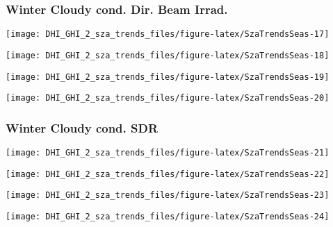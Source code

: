 \documentclass[
  10pt,
  a4paper,oneside]{article}
\begin{document}
\newpage

\hypertarget{winter-cloudy-cond.-dir.-beam-irrad.}{%
\subsubsection{Winter Cloudy cond. Dir. Beam Irrad.}\label{winter-cloudy-cond.-dir.-beam-irrad.}}

\begin{center}\texttt{[image: DHI\_GHI\_2\_sza\_trends\_files/figure-latex/SzaTrendsSeas-17]} \end{center}

\begin{center}\texttt{[image: DHI\_GHI\_2\_sza\_trends\_files/figure-latex/SzaTrendsSeas-18]} \end{center}

\begin{center}\texttt{[image: DHI\_GHI\_2\_sza\_trends\_files/figure-latex/SzaTrendsSeas-19]} \end{center}

\begin{center}\texttt{[image: DHI\_GHI\_2\_sza\_trends\_files/figure-latex/SzaTrendsSeas-20]} \end{center}

\newpage

\hypertarget{winter-cloudy-cond.-sdr}{%
\subsubsection{Winter Cloudy cond. SDR}\label{winter-cloudy-cond.-sdr}}

\begin{center}\texttt{[image: DHI\_GHI\_2\_sza\_trends\_files/figure-latex/SzaTrendsSeas-21]} \end{center}

\begin{center}\texttt{[image: DHI\_GHI\_2\_sza\_trends\_files/figure-latex/SzaTrendsSeas-22]} \end{center}

\begin{center}\texttt{[image: DHI\_GHI\_2\_sza\_trends\_files/figure-latex/SzaTrendsSeas-23]} \end{center}

\begin{center}\texttt{[image: DHI\_GHI\_2\_sza\_trends\_files/figure-latex/SzaTrendsSeas-24]} \end{center}
\end{document}
